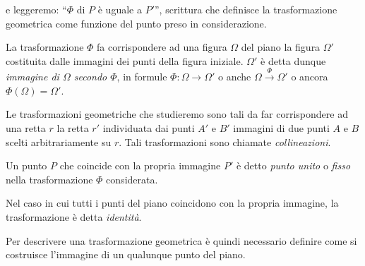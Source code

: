 
\noindent e leggeremo: ``$\Phi$ di $P$ è uguale a $P'$'', scrittura che definisce la trasformazione geometrica come funzione del punto preso in considerazione.

La trasformazione $\Phi$ fa corrispondere ad una figura $\Omega$ del piano la figura $\Omega'$ costituita dalle immagini dei punti della figura iniziale. $\Omega'$ è detta dunque \emph{immagine di $\Omega$ secondo $\Phi$}, in formule $\Phi: \Omega \rightarrow \Omega'$ o anche $\Omega\overset{\Phi}{\rightarrow}\Omega'$ o ancora $\Phi(\Omega)=\Omega'$.

Le trasformazioni geometriche che studieremo sono tali da far corrispondere ad una retta $r$ la retta $r'$ individuata dai punti $A'$ e $B'$ immagini di due punti $A$ e $B$ scelti arbitrariamente su $r$. Tali trasformazioni sono chiamate \emph{collineazioni}.

\begin{definizione}
Un punto $P$ che coincide con la propria immagine $P'$ è detto \emph{punto unito} o \emph{fisso} nella trasformazione $\Phi$ considerata.
\end{definizione}

Nel caso in cui tutti i punti del piano coincidono con la propria immagine, la trasformazione è detta \emph{identità}.

Per descrivere una trasformazione geometrica è quindi necessario definire come si costruisce l'immagine di un qualunque punto del piano.

